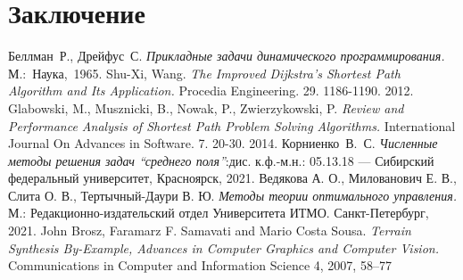     \section{Заключение}
    
    \newpage
    \begin{thebibliography}{9}
         Беллман~Р., Дрейфус~С. \textit{Прикладные задачи динамического программирования.} М.:~Наука,~1965.
         Shu-Xi, Wang. \textit{The Improved Dijkstra's Shortest Path Algorithm and Its Application.} Procedia Engineering. 29. 1186-1190. 2012.
         Glabowski, M., Musznicki, B., Nowak, P., Zwierzykowski, P. \textit{Review and Performance Analysis of Shortest Path Problem Solving Algorithms.} International Journal On Advances in Software. 7. 20-30. 2014.
         Корниенко~В.~С. \textit{Численные методы решения задач ``среднего поля''}:дис. к.ф.-м.н.: 05.13.18 --- Сибирский федеральный университет, Красноярск, 2021.
         Ведякова А. О., Милованович Е. В., Слита О. В., Тертычный-Даури В. Ю. \textit{Методы теории оптимального управления.} М.: Редакционно-издательский отдел Университета ИТМО. Санкт-Петербург, 2021.
         John Brosz, Faramarz F. Samavati and Mario Costa Sousa. \textit{Terrain Synthesis By-Example, Advances in Computer Graphics and Computer Vision.} Communications in Computer and Information Science 4, 2007, 58--77
    \end{thebibliography}



